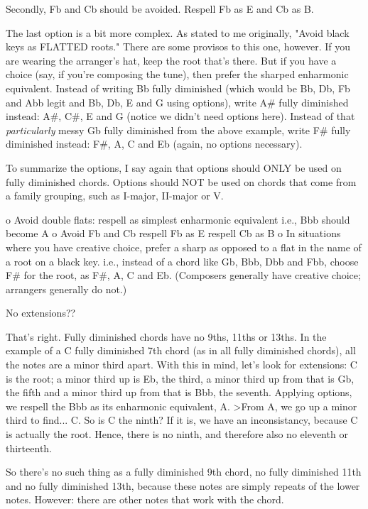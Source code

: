 Secondly, Fb and Cb should be avoided. Respell Fb as E and Cb as B.

The last option is a bit more complex. As stated to me originally, "Avoid
black keys as FLATTED roots." There are some provisos to this one, however.
If you are wearing the arranger's hat, keep the root that's there. But if
you have a choice (say, if you're composing the tune), then prefer the
sharped enharmonic equivalent. Instead of writing Bb fully diminished (which
would be Bb, Db, Fb and Abb legit and Bb, Db, E and G using options), write
A\# fully diminished instead: A\#, C\#, E and G (notice we didn't need options
here). Instead of that \emph{particularly} messy Gb fully diminished from the
above example, write F\# fully diminished instead: F\#, A, C and Eb (again,
no options necessary).

To summarize the options, I say again that options should ONLY be used on
fully diminished chords. Options should NOT be used on chords that come
from a family grouping, such as I-major, II-major or V.

  o Avoid double flats:
      respell as simplest enharmonic equivalent
      i.e., Bbb should become A
  o Avoid Fb and Cb
      respell Fb as E
      respell Cb as B
  o In situations where you have creative choice,
    prefer a sharp as opposed to a flat in the name
    of a root on a black key.
      i.e., instead of a chord like Gb, Bbb, Dbb and Fbb,
      choose F\# for the root, as F\#, A, C and Eb.
    (Composers generally have creative choice; arrangers
    generally do not.)

No extensions??

That's right. Fully diminished chords have no 9ths, 11ths or 13ths. In the
example of a C fully diminished 7th chord (as in all fully diminished chords),
all the notes are a minor third apart. With this in mind, let's look for
extensions: C is the root; a minor third up is Eb, the third, a minor third
up from that is Gb, the fifth and a minor third up from that is Bbb, the
seventh. Applying options, we respell the Bbb as its enharmonic equivalent, A.
>From A, we go up a minor third to find... C. So is C the ninth? If it is, we
have an inconsistancy, because C is actually the root. Hence, there is no
ninth, and therefore also no eleventh or thirteenth.

So there's no such thing as a fully diminished 9th chord, no fully diminished
11th and no fully diminished 13th, because these notes are simply repeats of
the lower notes. However: there are other notes that work with the chord.

